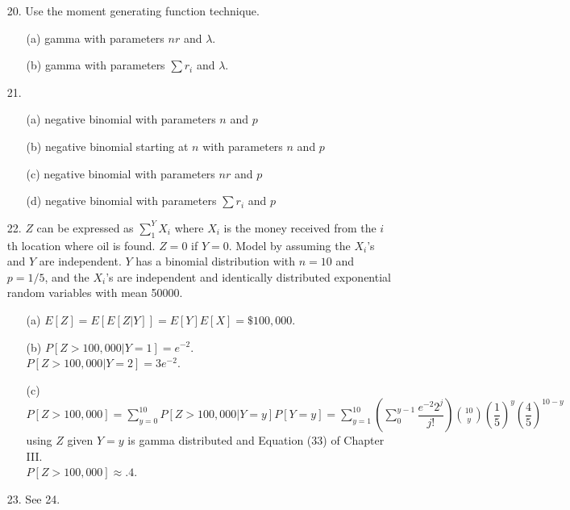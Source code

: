 \begin{enumerate}
	\item[20.] Use the moment generating function technique.
		\begin{enumerate}
			\item[(a)] gamma with parameters $nr$ and $\lambda$.
			\item[(b)] gamma with parameters $\sum r_i$ and $\lambda$.
		\end{enumerate}

	\item[21.] \begin{enumerate}
		\item[(a)] negative binomial with parameters $n$ and $p$
		\item[(b)] negative binomial starting at $n$ with parameters $n$ and $p$
		\item[(c)] negative binomial with parameters $nr$ and $p$
		\item[(d)] negative binomial with parameters $\sum r_i$ and $p$
	\end{enumerate}

	\item[22.] $Z$ can be expressed as $\displaystyle\sum_{1}^{Y}X_i$ where $X_i$ is the money received from the $i$th location where oil is found. $Z=0$ if $Y=0$. Model by assuming the $X_i$'s and $Y$ are independent. $Y$ has a binomial distribution with $n=10$ and $p=1/5$, and the $X_i$'s are independent and identically distributed exponential random variables with mean 50000. 
	\begin{enumerate}
		\item[(a)] $E[Z] = E[E[Z\vert Y]] = E[Y]E[X] = \$100,000$.
		\item[(b)] $P[Z>100,\!000\vert Y=1] = e^{-2}$. \\
		$P[Z>100,\!000\vert Y=2] = 3e^{-2}$.
		\item[(c)] $P[Z>100,\!000] = \displaystyle\sum_{y=0}^{10}P[Z>100,\!000\vert Y=y]P[Y=y] = \sum_{y=1}^{10}\left(\sum_{0}^{y-1}\dfrac{e^{-2}2^j}{j!}\right){10\choose y}\left(\dfrac{1}{5}\right)^y\left(\dfrac{4}{5}\right)^{10-y}$ using $Z$ given $Y=y$ is gamma distributed and Equation (33) of Chapter III. \\
		$P[Z>100,\!000]\approx .4$. 
	\end{enumerate}

	\item[23.] See 24.

	\newpage
	

\end{enumerate}
